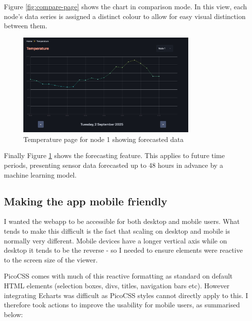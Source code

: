 Figure \ref{fig:compare-page} shows the chart in comparison mode. In this view,
each node's data series is assigned a distinct colour to allow for easy visual
distinction between them.

\begin{figure}[H]
    \centering
    \includegraphics[width=0.8\textwidth]{contents/part-3/fig3/forecast.jpg}
    \caption{Temperature page for node 1 showing forecasted data}
    \label{fig:forecast-page}
\end{figure}

Finally Figure \ref{fig:forecast-page} shows the forecasting feature. This
applies to future time periods, presenting sensor data forecasted up to 48 hours
in advance by a machine learning model.

\subsection{Making the app mobile friendly}

I wanted the webapp to be accessible for both desktop and mobile users. What
tends to make this difficult is the fact that scaling on desktop and mobile is
normally very different. Mobile devices have a longer vertical axis while on
desktop it tends to be the reverse - so I needed to ensure elements were
reactive to the screen size of the viewer.

PicoCSS comes with much of this reactive formatting as standard on default HTML
elements (selection boxes, divs, titles, navigation bars etc). However
integrating Echarts was difficult as PicoCSS styles cannot directly apply to
this. I therefore took actions to improve the usability for mobile users, as
summarised below:

